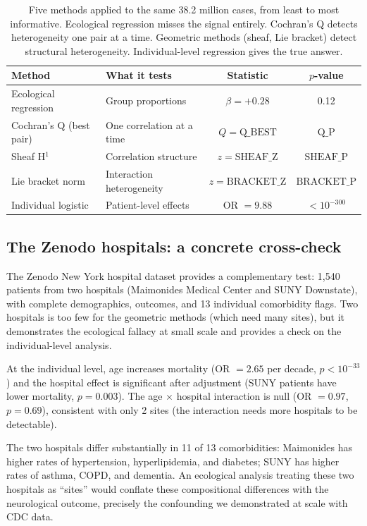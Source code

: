 \documentclass{article}
\begin{document}
\begin{table}[t]
\centering
\caption{Five methods applied to the same 38.2 million cases, from least to
most informative.  Ecological regression misses the signal entirely.
Cochran's Q detects heterogeneity one pair at a time.  Geometric methods
(sheaf, Lie bracket) detect structural heterogeneity.  Individual-level
regression gives the true answer.}
\label{tab:comparison}
\begin{tabular}{llcc}
\toprule
Method & What it tests & Statistic & $p$-value \\
\midrule
Ecological regression & Group proportions & $\beta = +0.28$ & 0.12 \\
Cochran's Q (best pair) & One correlation at a time & $Q = \text{Q\_BEST}$ & $\text{Q\_P}$ \\
Sheaf H$^1$ & Correlation structure & $z = \text{SHEAF\_Z}$ & $\text{SHEAF\_P}$ \\
Lie bracket norm & Interaction heterogeneity & $z = \text{BRACKET\_Z}$ & $\text{BRACKET\_P}$ \\
Individual logistic & Patient-level effects & OR $= 9.88$ & $< 10^{-300}$ \\
\bottomrule
\end{tabular}
\end{table}


\subsection{The Zenodo hospitals: a concrete cross-check}

The Zenodo New York hospital dataset provides a complementary test: 1,540
patients from two hospitals (Maimonides Medical Center and SUNY Downstate),
with complete demographics, outcomes, and 13 individual comorbidity flags.
Two hospitals is too few for the geometric methods (which need many sites), but
it demonstrates the ecological fallacy at small scale and provides a check on
the individual-level analysis.

At the individual level, age increases mortality (OR $= 2.65$ per decade,
$p < 10^{-33}$) and the hospital effect is significant after adjustment
(SUNY patients have lower mortality, $p = 0.003$).  The age $\times$ hospital
interaction is null (OR $= 0.97$, $p = 0.69$), consistent with only 2
sites (the interaction needs more hospitals to be detectable).

The two hospitals differ substantially in 11 of 13 comorbidities: Maimonides
has higher rates of hypertension, hyperlipidemia, and diabetes; SUNY has
higher rates of asthma, COPD, and dementia.  An ecological analysis treating
these two hospitals as ``sites'' would conflate these compositional differences
with the neurological outcome, precisely the confounding we demonstrated at
scale with CDC data.
\end{document}
